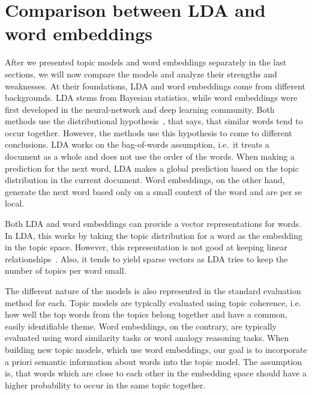 \documentclass[
        a4paper,
        titlepage,
        twoside,
        parskip,
        numbers=noenddot
        ]{scrbook}
\theoremstyle{break}
\begin{document}
\section{Comparison between LDA and word embeddings}

After we presented topic models and word embeddings separately in the last sections, we will now compare the models and analyze their strengths and weaknesses.
At their foundations, LDA and word embeddings come from different backgrounds.
LDA stems from Bayesian statistics, while word embeddings were first developed in the neural-network and deep learning community.
Both methods use the distributional hypothesis~\cite{Firth1957}, that says, that similar words tend to occur together.
However, the methods use this hypothesis to come to different conclusions.
LDA works on the bag-of-words assumption, i.e.\ it treats a document as a whole and does not use the order of the words.
When making a prediction for the next word, LDA makes a global prediction based on the topic distribution in the current document.
Word embeddings, on the other hand, generate the next word based only on a small context of the word and are per se local.

Both LDA and word embeddings can provide a vector representations for words.
In LDA, this works by taking the topic distribution for a word as the embedding in the topic space.
However, this representation is not good at keeping linear relationships~\cite{Mikolov2013b,Mikolov2013a}.
Also, it tends to yield sparse vectors as LDA tries to keep the number of topics per word small.

The different nature of the models is also represented in the standard evaluation method for each.
Topic models are typically evaluated using topic coherence, i.e. how well the top words from the topics belong together and have a common, easily identifiable theme.
Word embeddings, on the contrary, are typically evaluated using word similarity tasks or word analogy reasoning tasks.
When building new topic models, which use word embeddings, our goal is to incorporate a priori semantic information about words into the topic model.
The assumption is, that words which are close to each other in the embedding space should have a higher probability to occur in the same topic together.
\end{document}
